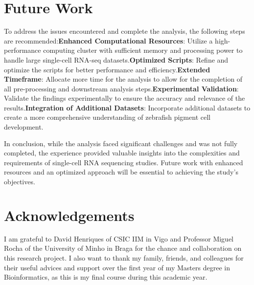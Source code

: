 \documentclass[runningheads]{llncs}
\begin{document}
\section{Future Work}
To address the issues encountered and complete the analysis, the following steps are recommended:\newline\textbf{Enhanced Computational Resources}: Utilize a high-performance computing cluster with sufficient memory and processing power to handle large single-cell RNA-seq datasets.\newline\textbf{Optimized Scripts}: Refine and optimize the scripts for better performance and efficiency.\newline\textbf{Extended Timeframe}: Allocate more time for the analysis to allow for the completion of all pre-processing and downstream analysis steps.\newline\textbf{Experimental Validation}: Validate the findings experimentally to ensure the accuracy and relevance of the results.\newline\textbf{Integration of Additional Datasets}: Incorporate additional datasets to create a more comprehensive understanding of zebrafish pigment cell development.

In conclusion, while the analysis faced significant challenges and was not fully completed, the experience provided valuable insights into the complexities and requirements of single-cell RNA sequencing studies. Future work with enhanced resources and an optimized approach will be essential to achieving the study's objectives.

\section*{Acknowledgements}
I am grateful to David Henriques of CSIC IIM in Vigo and Professor Miguel Rocha of the University of Minho in Braga for the chance and collaboration on this research project. I also want to thank my family, friends, and colleagues for their useful advices and support over the first year of my Masters degree in Bioinformatics, as this is my final course during this academic year.

\newpage


\end{document}
